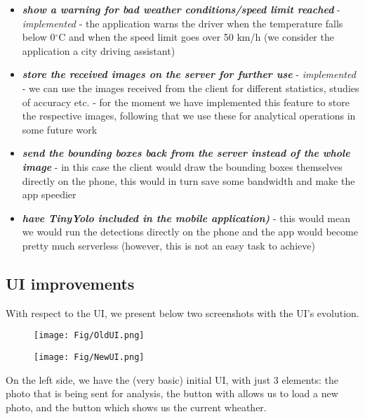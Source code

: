 \documentclass[runningheads,a4paper,11pt]{report}
\begin{document}
\begin{itemize}
    \item \textbf{\emph{show a warning for bad weather conditions/speed limit reached}} - \emph{implemented} - the application warns the driver when the temperature falls below 0$^{\circ}$C and when the speed limit goes over 50 km/h (we consider the application a city driving assistant)
    \item \textbf{\emph{store the received images on the server for further use}} - \emph{implemented} - we can use the images received from the client for different statistics, studies of accuracy etc. - for the moment we have implemented this feature to store the respective images, following that we use these for analytical operations in some future work
    \item \textbf{\emph{send the bounding boxes back from the server instead of the whole image}} - in this case the client would draw the bounding boxes themselves directly on the phone, this would in turn save some bandwidth and make the app speedier
    \item \textbf{\emph{have TinyYolo included in the mobile application)}} - this would mean we would run the detections directly on the phone and the app would become pretty much serverless (however, this is not an easy task to achieve)
\end{itemize}

\subsection{UI improvements}

With respect to the UI, we present below two screenshots with the UI's evolution.

\begin{figure}[hbp]
\centering
\begin{minipage}{.5\textwidth}
  \centering
  \texttt{[image: Fig/OldUI.png]}
  \label{fig:userInterface1}
\end{minipage}%
\begin{minipage}{.5\textwidth}
  \centering
  \texttt{[image: Fig/NewUI.png]}
  \label{fig:userInterface2}
\end{minipage}
\end{figure}

On  the left side, we have the (very basic) initial UI, with just 3 elements: the photo that is being sent for analysis, the button with allows us to load a new photo, and the button which shows us the current wheather.
\end{document}
